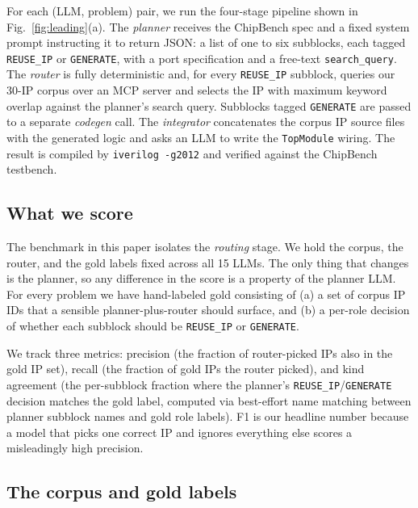 \documentclass[conference]{IEEEtran}
\begin{document}
For each (LLM, problem) pair, we run the four-stage pipeline shown in Fig.~\ref{fig:leading}(a). The \emph{planner} receives the ChipBench spec and a fixed system prompt instructing it to return JSON: a list of one to six subblocks, each tagged \texttt{REUSE\_IP} or \texttt{GENERATE}, with a port specification and a free-text \texttt{search\_query}. The \emph{router} is fully deterministic and, for every \texttt{REUSE\_IP} subblock, queries our 30-IP corpus over an MCP server and selects the IP with maximum keyword overlap against the planner's search query. Subblocks tagged \texttt{GENERATE} are passed to a separate \emph{codegen} call. The \emph{integrator} concatenates the corpus IP source files with the generated logic and asks an LLM to write the \texttt{TopModule} wiring. The result is compiled by \texttt{iverilog -g2012} and verified against the ChipBench testbench.

\subsection{What we score}

The benchmark in this paper isolates the \emph{routing} stage. We hold the corpus, the router, and the gold labels fixed across all 15 LLMs. The only thing that changes is the planner, so any difference in the score is a property of the planner LLM. For every problem we have hand-labeled gold consisting of (a) a set of corpus IP IDs that a sensible planner-plus-router should surface, and (b) a per-role decision of whether each subblock should be \texttt{REUSE\_IP} or \texttt{GENERATE}.

We track three metrics: precision (the fraction of router-picked IPs also in the gold IP set), recall (the fraction of gold IPs the router picked), and kind agreement (the per-subblock fraction where the planner's \texttt{REUSE\_IP}/\texttt{GENERATE} decision matches the gold label, computed via best-effort name matching between planner subblock names and gold role labels). F1 is our headline number because a model that picks one correct IP and ignores everything else scores a misleadingly high precision.

\subsection{The corpus and gold labels}
\end{document}
